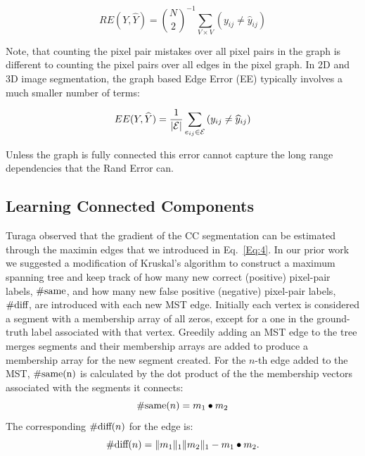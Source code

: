 \documentclass[letterpaper,twocolumn,fleqn]{article}
\begin{document}
$$RE(Y,\widehat{Y})=\binom{N}{2}^{-1} \sum_{V\times V } \left(y_{ij}\neq\widehat{y}_{ij}\right)$$

Note, that counting the pixel pair mistakes over all pixel pairs in the graph is different to counting the pixel pairs over all edges in the pixel graph. In 2D and 3D image segmentation, the graph based Edge Error (EE) typically involves a much smaller number of terms:

$$EE(Y,\widehat{Y})=\frac{1}{\vert \cal{E}\vert} \sum_{e_{ij}\in\cal{E} } \left(y_{ij}\neq\widehat{y}_{ij}\right)$$

Unless the graph is fully connected this error cannot capture the long range dependencies that the Rand Error can.

\subsection{Learning Connected Components}

Turaga \cite{Turaga09} \cite{Turaga10} observed that the gradient of the CC segmentation can be estimated through the maximin edges that we introduced in Eq.~\ref{Eq:4}. In our prior work we suggested a modification of Kruskal's algorithm \cite{Kruskal} to construct a maximum spanning tree and keep track of how many new correct (positive) pixel-pair labels, $\#\hbox{same}$, and how many new false positive (negative) pixel-pair labels, $\#\hbox{diff}$, are introduced with each new MST edge. Initially each vertex is considered a segment with a membership array of all zeros, except for a one in the ground-truth label associated with that vertex. Greedily adding an MST edge to the tree merges segments and their membership arrays are added to produce a membership array for the new segment created. For the $n$-th edge added to the MST, $\#\hbox{same(n)}$ is calculated by the dot product of the the membership vectors associated with the segments it connects:
\begin{equation}
\#\hbox{same}(n)=m_1\bullet m_2    
\end{equation}
The corresponding $\#\hbox{diff}(n)$ for the edge is: 
\begin{equation}
\#\hbox{diff}(n)=\Vert m_1\Vert_1 \Vert m_2\Vert_1-m_1\bullet m_2.
\end{equation}
\end{document}
